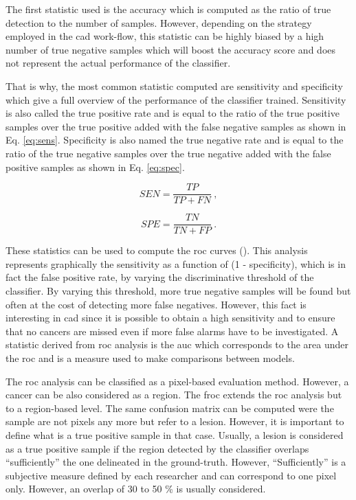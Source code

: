 The first statistic used is the accuracy which is computed as the ratio of true detection to the number of samples. However, depending on the strategy employed in the \ac{cad} work-flow, this statistic can be highly biased by a high number of true negative samples which will boost the accuracy score and does not represent the actual performance of the classifier.

That is why, the most common statistic computed are sensitivity and specificity which give a full overview of the performance of the classifier trained. Sensitivity is also called the true positive rate and is equal to the ratio of the true positive samples over the true positive added with the false negative samples as shown in Eq. \eqref{eq:sens}. Specificity is also named the true negative rate and is equal to the ratio of the true negative samples over the true negative added with the false positive samples as shown in Eq. \eqref{eq:spec}.

\begin{equation}
	SEN = \frac{TP}{TP+FN} \ ,
	\label{eq:sens}
\end{equation}

\begin{equation}
	SPE = \frac{TN}{TN+FP} \ .
	\label{eq:spec}
\end{equation}

These statistics can be used to compute the \acf{roc} curves (\cite{Metz2006}). This analysis represents graphically the sensitivity as a function of (1 - specificity), which is in fact the false positive rate, by varying the discriminative threshold of the classifier. By varying this threshold, more true negative samples will be found but often at the cost of detecting more false negatives. However, this fact is interesting in \ac{cad} since it is possible to obtain a high sensitivity and to ensure that no cancers are missed even if more false alarms have to be investigated. A statistic derived from \ac{roc} analysis is the \acf{auc} which corresponds to the area under the \ac{roc} and is a measure used to make comparisons between models.

The \ac{roc} analysis can be classified as a pixel-based evaluation method. However, a cancer can be also considered as a region. The \acf{froc} extends the \ac{roc} analysis but to a region-based level. The same confusion matrix can be computed were the sample are not pixels any more but refer to a lesion. However, it is important to define what is a true positive sample in that case. Usually, a lesion is considered as a true positive sample if the region detected by the classifier overlaps ``sufficiently'' the one delineated in the ground-truth. However, ``Sufficiently'' is a subjective measure defined by each researcher and can correspond to one pixel only. However, an overlap of 30 to 50 \% is usually considered.

